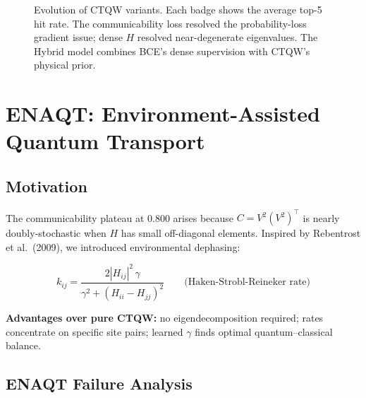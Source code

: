 \documentclass[11pt,a4paper]{article}
\begin{document}
\begin{figure}[H]
\caption{Evolution of CTQW variants. Each badge shows the average
top-5 hit rate. The communicability loss resolved the probability-loss
gradient issue; dense $H$ resolved near-degenerate eigenvalues. The
Hybrid model combines BCE's dense supervision with CTQW's physical prior.}
\end{figure}

\section{ENAQT: Environment-Assisted Quantum Transport}

\subsection{Motivation}

The communicability plateau at 0.800 arises because $C = V^2(V^2)^\top$ is
nearly doubly-stochastic when $H$ has small off-diagonal elements. Inspired by
Rebentrost et al.\ (2009), we introduced environmental dephasing:

\begin{equation}
  k_{ij} = \frac{2|H_{ij}|^2\,\gamma}{\gamma^2 + (H_{ii}-H_{jj})^2}
  \qquad \text{(Haken-Strobl-Reineker rate)}
\end{equation}

\noindent\textbf{Advantages over pure CTQW:}
no eigendecomposition required; rates concentrate on specific site pairs;
learned $\gamma$ finds optimal quantum--classical balance.

\subsection{ENAQT Failure Analysis}
\end{document}

